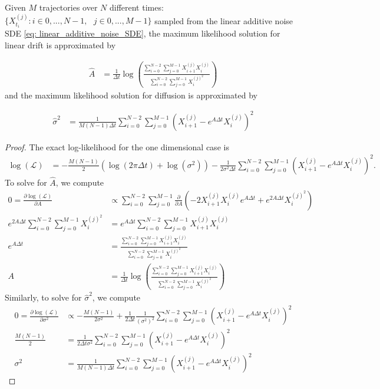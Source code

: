 \documentclass[twoside,11pt]{article}
\newcommand{\rv}[1]{\textcolor{black}{#1}}
\begin{document}
\begin{prop}[\rv{Exact MLE for a $1$-d SDE from multiple trajectories}] 
Given $M$ trajectories over $N$ different times: $\{X_{t_i}^{(j)} : i \in 0, ..., N-1, \text{ } j \in 0, ..., M-1\}$ sampled from the linear additive noise SDE \eqref{eq: linear_additive_noise_SDE}, the maximum likelihood solution for linear drift is approximated by 

\begin{align}
    \hat{A}&= \frac{1}{ \Delta t} \log \left(\frac{\sum_{i=0}^{N-2}\sum_{j=0}^{M-1} X_{i+1}^{(j)}X_i^{(j)}  }{\sum_{i=0}^{N-2}\sum_{j=0}^{M-1} X_i^{{(j)}^2}} \right)
\end{align}
and the maximum likelihood solution for diffusion is approximated by

\begin{align}
\hat{\sigma}^2&= \frac{1}{M(N-1) \Delta t}\sum_{i=0}^{N-2}\sum_{j=0}^{M-1} (X_{i+1}^{(j)} - e^{A \Delta t}X_{{i}}^{(j)})^2
\end{align}
\label{thm: MLE_SDE_params_1D_exact}
\end{prop}
\begin{proof}
The exact log-likelihood for the one dimensional case is
\begin{align*}
\log(\mathcal{L})&= -\frac{M(N-1)}{2}\left(\log(2\pi  \Delta t) + \log(\sigma^2)\right)- \frac{1}{2\sigma^2 \Delta t}\sum_{i=0}^{N-2}\sum_{j=0}^{M-1}(X_{i+1}^{(j)} - e^{A \Delta t}X_{{i}}^{(j)})^2.
\end{align*}
To solve for $\hat{A}$, we compute
\begin{align*}
0 = \frac{\partial \log(\mathcal{L})}{\partial A} &\propto \sum_{i=0}^{N-2}\sum_{j=0}^{M-1} \frac{\partial}{\partial A}\left(-2X_{i+1}^{(j)}X_i^{(j)}e^{A \Delta t} + e^{2A \Delta t}X_i^{{(j)}^2} \right)\\
e^{2A \Delta t}\sum_{i=0}^{N-2}\sum_{j=0}^{M-1} X_i^{{(j)}^2}&=e^{A \Delta t}\sum_{i=0}^{N-2}\sum_{j=0}^{M-1} X_{i+1}^{(j)}X_i^{(j)}  \\
 e^{A \Delta t} &= \frac{\sum_{i=0}^{N-2}\sum_{j=0}^{M-1} X_{i+1}^{(j)} X_i^{(j)} }{\sum_{i=0}^{N-2}\sum_{j=0}^{M-1} X_i^{{(j)}^2}}\\
 A &= \frac{1}{ \Delta t}\log\left(\frac{\sum_{i=0}^{N-2}\sum_{j=0}^{M-1} X_{i+1}^{(j)}X_i^{(j)}  }{\sum_{i=0}^{N-2}\sum_{j=0}^{M-1} X_i^{{(j)}^2}} \right)
\end{align*}
Similarly, to solve for $\hat{\sigma}^2$, we compute
\begin{align*}
0 = \frac{\partial \log(\mathcal{L})}{\partial \sigma^2} &\propto -\frac{M(N-1)}{2\sigma^2}+\frac{1}{2 \Delta t}\frac{1}{(\sigma^2)^2}\sum_{i=0}^{N-2}\sum_{j=0}^{M-1} (X_{i+1}^{(j)} - e^{A \Delta t}X_{{i}}^{(j)})^2\\
\frac{M(N-1)}{2} &= \frac{1}{2 \Delta t\sigma^2}\sum_{i=0}^{N-2}\sum_{j=0}^{M-1} (X_{i+1}^{(j)} - e^{A \Delta t}X_{{i}}^{(j)})^2\\
\sigma^2 &= \frac{1}{M(N-1) \Delta t}\sum_{i=0}^{N-2}\sum_{j=0}^{M-1} (X_{i+1}^{(j)} - e^{A \Delta t}X_{{i}}^{(j)})^2
\end{align*}
\end{proof}
\end{document}
